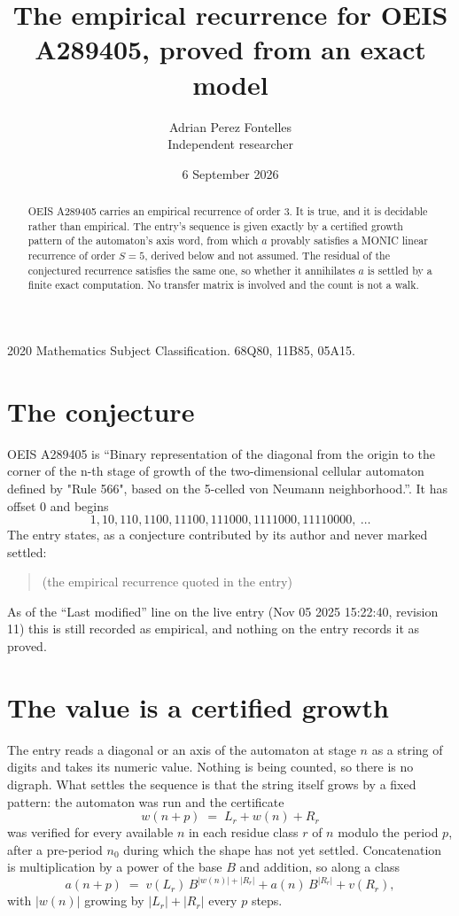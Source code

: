 \documentclass[11pt,a4paper]{article}
\title{The empirical recurrence for OEIS A289405, proved from an exact model}
\author{Adrian Perez Fontelles\\ \small Independent researcher}
\date{6 September 2026}
\theoremstyle{plain}
\theoremstyle{definition}
\begin{document}
\maketitle

\begin{abstract}
OEIS A289405 carries an empirical recurrence of order $3$. It is true, and it is
decidable rather than empirical. The entry's sequence is given exactly by a certified growth pattern of the automaton's axis word, from
which $a$ provably satisfies a MONIC linear recurrence of order $S=5$, derived below and not
assumed. The residual of the conjectured recurrence satisfies the same one, so whether it
annihilates $a$ is settled by a finite exact computation. No transfer matrix is involved and
the count is not a walk.
\end{abstract}

\noindent\small 2020 Mathematics Subject Classification. 68Q80, 11B85, 05A15.\normalsize

\section{The conjecture}

OEIS A289405 is ``Binary representation of the diagonal from the origin to the corner of the n-th stage of growth of the two-dimensional cellular automaton defined by "Rule 566", based on the 5-celled von Neumann neighborhood.''. It has offset $0$ and begins
\[
1, 10, 110, 1100, 11100, 111000, 1111000, 11110000,\ \dots
\]
The entry states, as a conjecture contributed by its author and never marked settled:
\begin{quote}
(the empirical recurrence quoted in the entry)
\end{quote}
As of the ``Last modified'' line on the live entry (Nov 05 2025 15:22:40, revision 11)
this is still recorded as empirical, and nothing on the entry records it as proved.

\section{The value is a certified growth}

The entry reads a diagonal or an axis of the automaton at stage $n$ as a string of digits and takes its
numeric value. Nothing is being counted, so there is no digraph. What settles the sequence is
that the string itself grows by a fixed pattern: the automaton was run and the certificate
\[
w(n+p)\;=\;L_r + w(n) + R_r
\]
was verified for every available $n$ in each residue class $r$ of $n$ modulo the period $p$,
after a pre-period $n_0$ during which the shape has not yet settled. Concatenation is
multiplication by a power of the base $B$ and addition, so along a class
\[
a(n+p)\;=\;v(L_r)\,B^{|w(n)|+|R_r|} + a(n)\,B^{|R_r|} + v(R_r),
\]
with $|w(n)|$ growing by $|L_r|+|R_r|$ every $p$ steps.
\end{document}
